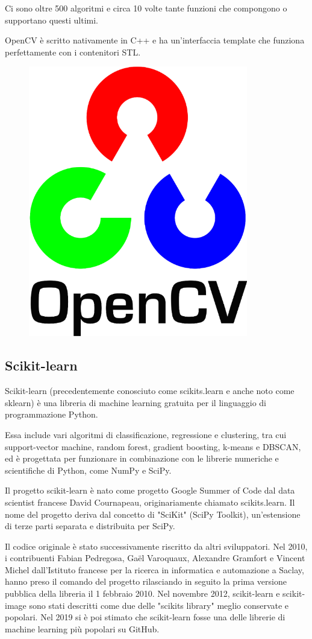 Ci sono oltre 500 algoritmi e circa 10 volte tante funzioni che compongono o supportano questi ultimi.

OpenCV è scritto nativamente in C++ e ha un'interfaccia template che funziona perfettamente con i contenitori STL.

\begin{figure}
    \begin{center}    
        \includegraphics[width=0.5\linewidth]{images/image8.png}
    \end{center}
\end{figure}

\subsection{Scikit-learn}
Scikit-learn \cite{scikitLearn} (precedentemente conosciuto come scikits.learn e anche noto come sklearn) è una libreria di machine learning gratuita per il linguaggio di programmazione Python. 

Essa include vari algoritmi di classificazione, regressione e clustering, tra cui support-vector machine, random forest, gradient boosting, k-means e DBSCAN, ed è progettata per funzionare in combinazione con le librerie numeriche e scientifiche di Python, come NumPy e SciPy. 

Il progetto scikit-learn è nato come progetto Google Summer of Code dal data scientist francese David Cournapeau, originariamente chiamato scikits.learn. Il nome del progetto deriva dal concetto di "SciKit" (SciPy Toolkit), un'estensione di terze parti separata e distribuita per SciPy. 

Il codice originale è stato successivamente riscritto da altri sviluppatori. Nel 2010, i contribuenti Fabian Pedregosa, Gaël Varoquaux, Alexandre Gramfort e Vincent Michel dall'Istituto francese per la ricerca in informatica e automazione a Saclay, hanno preso il comando del progetto rilasciando in  seguito la prima versione pubblica della libreria il 1 febbraio 2010. Nel novembre 2012, scikit-learn e scikit-image sono stati descritti come due delle "scikits library" meglio conservate e popolari. 
Nel 2019 si è poi stimato che scikit-learn fosse una delle librerie di machine learning più popolari su GitHub.

